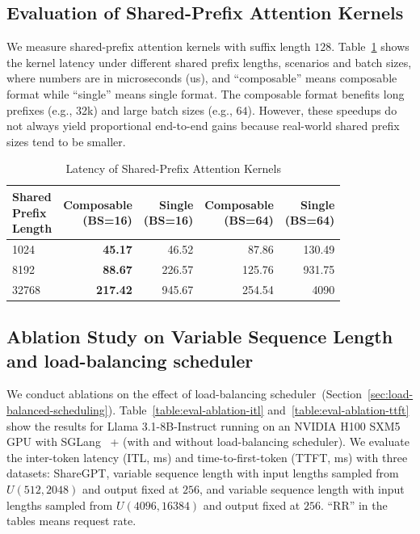 \subsection{Evaluation of Shared-Prefix Attention Kernels}

We measure shared-prefix attention kernels with suffix length $128$.
Table~\ref{table:eval-shared-prefix-attn} shows the kernel latency under different shared prefix lengths, scenarios and batch sizes, where numbers are in microseconds (us), and ``composable'' means composable format while ``single'' means single format.
The composable format benefits long prefixes (e.g., 32k) and large batch sizes (e.g., $64$).
However, these speedups do not always yield proportional end-to-end gains because real-world shared prefix sizes tend to be smaller.

\begin{table}[hbt]
\small
\centering
\caption{Latency of Shared-Prefix Attention Kernels}
\label{table:eval-shared-prefix-attn}
\begin{tabular}{lr@{}r@{}r@{}r@{}}
\toprule
\makecell{Shared \\ Prefix \\ Length} & \makecell{Composable \\ (BS=16)} & \makecell{Single \\ (BS=16)} & \makecell{Composable \\ (BS=64)} & \makecell{Single \\ (BS=64)} \\
\midrule
1024   & \textbf{45.17}  & 46.52  & 87.86   & 130.49 \\
8192   & \textbf{88.67}  & 226.57 & 125.76  & 931.75 \\
32768  & \textbf{217.42} & 945.67 & 254.54  & 4090   \\
\bottomrule
\end{tabular}
\end{table}

\subsection{Ablation Study on Variable Sequence Length and load-balancing scheduler}

We conduct ablations on the effect of load-balancing scheduler~(Section~\ref{sec:load-balanced-scheduling}).
Table~\ref{table:eval-ablation-itl} and~\ref{table:eval-ablation-ttft} show the results for Llama 3.1-8B-Instruct running on an NVIDIA H100 SXM5 GPU with SGLang~\cite{zheng2023sglang} + \sys (with and without load-balancing scheduler).
We evaluate the inter-token latency (ITL, ms) and time-to-first-token (TTFT, ms) with three datasets: ShareGPT, variable sequence length with input lengths sampled from $U(512, 2048)$ and output fixed at $256$, and variable sequence length with input lengths sampled from $U(4096, 16384)$ and output fixed at $256$. ``RR'' in the tables means request rate.


